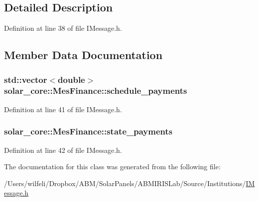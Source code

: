 \subsection{Detailed Description}


Definition at line 38 of file I\+Message.\+h.



\subsection{Member Data Documentation}
\hypertarget{classsolar__core_1_1_mes_finance_aa5f0c5370821ad09da5aea0da9c03a29}{}
\subsubsection[{schedule\+\_\+payments}]{\setlength{\rightskip}{0pt plus 5cm}std\+::vector$<$double$>$ solar\+\_\+core\+::\+Mes\+Finance\+::schedule\+\_\+payments}\label{classsolar__core_1_1_mes_finance_aa5f0c5370821ad09da5aea0da9c03a29}


Definition at line 41 of file I\+Message.\+h.

\hypertarget{classsolar__core_1_1_mes_finance_a5411785779f982be49c7e14584ce2fe2}{}
\subsubsection[{state\+\_\+payments}]{ solar\+\_\+core\+::\+Mes\+Finance\+::state\+\_\+payments}\label{classsolar__core_1_1_mes_finance_a5411785779f982be49c7e14584ce2fe2}


Definition at line 42 of file I\+Message.\+h.



The documentation for this class was generated from the following file\+:\begin{DoxyCompactItemize}
\item 
/\+Users/wilfeli/\+Dropbox/\+A\+B\+M/\+Solar\+Panels/\+A\+B\+M\+I\+R\+I\+S\+Lab/\+Source/\+Institutions/\hyperlink{_i_message_8h}{I\+Message.\+h}\end{DoxyCompactItemize}
